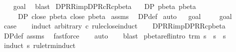 \begin{isabellebody}
\ \ \isamarkupfalse%
\ goal{}{\isacharparenleft}{}{\isacharparenright}\ \isamarkupfalse%
\ blast{\isacharplus}\isanewline
{}\isamarkupfalse%
%
\endisatagproof
{\isafoldproof}%
%
\isadelimproof
\isanewline
%
\endisadelimproof
\isanewline
{}\isamarkupfalse%
\ DP{\isacharunderscore}R{\isacharunderscore}R{\isacharunderscore}imp{\isacharunderscore}DP{\isacharunderscore}Rc{\isacharunderscore}Rc{\isacharunderscore}pbeta{\isacharcolon}\isanewline
\ \ \ {\isachardoublequoteopen}DP\ pbeta\ pbeta{\isachardoublequoteclose}\isanewline
\ \ \ \ \ {\isachardoublequoteopen}DP\ {\isacharparenleft}close\ pbeta{\isacharparenright}\ {\isacharparenleft}close\ pbeta{\isacharparenright}{\isachardoublequoteclose}\isanewline
%
\isadelimproof
%
\endisadelimproof
%
\isatagproof
{}\isamarkupfalse%
\ assms\ \isamarkupfalse%
\ DP{\isacharunderscore}def\isanewline
{}\isamarkupfalse%
\ auto\isanewline
{}\isamarkupfalse%
\ {\isacharminus}\isanewline
{}\isamarkupfalse%
\ goal{}\ \isanewline
\ \ \isamarkupfalse%
\ goal{}{\isacharparenleft}{}{\isacharcomma}{}{\isacharparenright}\ \isamarkupfalse%
\ {\isacharquery}case\isanewline
\ \ \isamarkupfalse%
\ {\isacharparenleft}induct\ arbitrary{\isacharcolon}\ c\ rule{\isacharcolon}close{\isachardot}induct{\isacharparenright}\isanewline
\ \ \isamarkupfalse%
\ DP{\isacharunderscore}R{\isacharunderscore}R{\isacharunderscore}imp{\isacharunderscore}DP{\isacharunderscore}R{\isacharunderscore}Rc{\isacharunderscore}pbeta\ \isamarkupfalse%
\ DP{\isacharunderscore}def\ assms\ \isamarkupfalse%
\ fastforce\isanewline
\ \ \isamarkupfalse%
\ auto\isanewline
\ \ \isamarkupfalse%
\ blast\isanewline
{}\isamarkupfalse%
%
\endisatagproof
{\isafoldproof}%
%
\isadelimproof
\isanewline
%
\endisadelimproof
\isanewline
{}\isamarkupfalse%
\ pbeta{\isacharunderscore}refl{\isacharbrackleft}intro{\isacharbrackright}{\isacharcolon}\ {\isachardoublequoteopen}trm\ s\ {\isasymLongrightarrow}\ s\ {\isasymggreater}\ s{\isachardoublequoteclose}\isanewline
%
\isadelimproof
%
\endisadelimproof
%
\isatagproof
{}\isamarkupfalse%
\ {\isacharparenleft}induct\ s\ rule{\isacharcolon}trm{\isachardot}induct{\isacharparenright}\isanewline
{}\isamarkupfalse%

\end{isabellebody}
